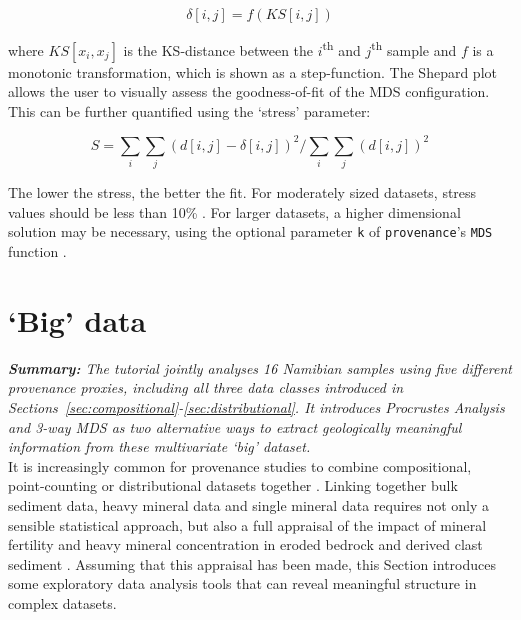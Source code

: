 \documentclass[11pt]{article}
\begin{document}
\begin{equation}
  \delta[i,j] = f(KS[i,j])
\end{equation}

where $KS[x_i,x_j]$ is the KS-distance between the
$i$\textsuperscript{th} and $j$\textsuperscript{th} sample and $f$ is
a monotonic transformation, which is shown as a step-function.  The
Shepard plot allows the user to visually assess the goodness-of-fit of
the MDS configuration. This can be further quantified using the
`stress' parameter:

\begin{equation}
  S = \sum_i\sum_j(d[i,j]-\delta[i,j])^2\bigg/\sum_i\sum_j(d[i,j])^2
\end{equation}

The lower the stress, the better the fit. For moderately sized
datasets, stress values should be less than 10\%
\citep{kruskal1978}. For larger datasets, a higher dimensional
solution may be necessary, using the optional parameter \texttt{k} of
\texttt{provenance}'s \texttt{MDS} function \citep{stephan2018}.
  
\section{`Big' data}
\label{sec:bigdata}

\textit{\textbf{Summary:} The tutorial jointly analyses 16 Namibian
  samples using five different provenance proxies, including all three
  data classes introduced in
  Sections~\ref{sec:compositional}-\ref{sec:distributional}. It
  introduces Procrustes Analysis and 3-way MDS as two alternative ways
  to extract geologically meaningful information from these
  multivariate `big' dataset.}\\

It is increasingly common for provenance studies to combine
compositional, point-counting or distributional datasets together
\citep{vermeesch2015, rittner2016}.  Linking together bulk sediment
data, heavy mineral data and single mineral data requires not only a
sensible statistical approach, but also a full appraisal of the impact
of mineral fertility and heavy mineral concentration in eroded bedrock
and derived clast sediment \citep{garzanti2007, malusa2016,
  malusa2019b}. Assuming that this appraisal has been made, this
Section introduces some exploratory data analysis tools that can
reveal meaningful structure in complex datasets.
\end{document}
